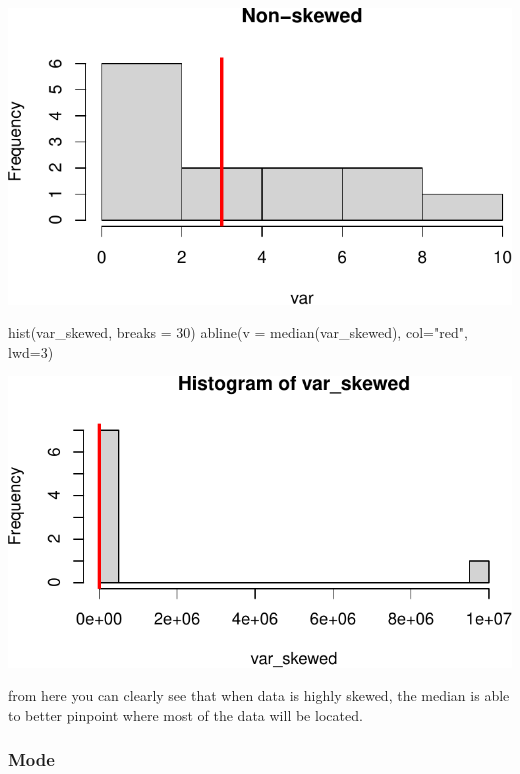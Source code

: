 \documentclass[
  letterpaper,
  DIV=11,
  numbers=noendperiod]{scrartcl}
\newenvironment{Shaded}{\begin{snugshade}}{\end{snugshade}}
\newcommand{\AttributeTok}[1]{\textcolor[rgb]{0.40,0.45,0.13}{#1}}
\newcommand{\DecValTok}[1]{\textcolor[rgb]{0.68,0.00,0.00}{#1}}
\newcommand{\FunctionTok}[1]{\textcolor[rgb]{0.28,0.35,0.67}{#1}}
\newcommand{\NormalTok}[1]{\textcolor[rgb]{0.00,0.23,0.31}{#1}}
\newcommand{\StringTok}[1]{\textcolor[rgb]{0.13,0.47,0.30}{#1}}
\begin{document}
\includegraphics{stats_review_files/figure-pdf/unnamed-chunk-7-1.pdf}

\begin{Shaded}
\begin{Highlighting}[]
\FunctionTok{hist}\NormalTok{(var\_skewed, }\AttributeTok{breaks =} \DecValTok{30}\NormalTok{)}
\FunctionTok{abline}\NormalTok{(}\AttributeTok{v =} \FunctionTok{median}\NormalTok{(var\_skewed), }\AttributeTok{col=}\StringTok{"red"}\NormalTok{, }\AttributeTok{lwd=}\DecValTok{3}\NormalTok{)}
\end{Highlighting}
\end{Shaded}

\includegraphics{stats_review_files/figure-pdf/unnamed-chunk-8-1.pdf}

from here you can clearly see that when data is highly skewed, the
median is able to better pinpoint where most of the data will be
located.

\subsubsection{Mode}\label{mode}
\end{document}
